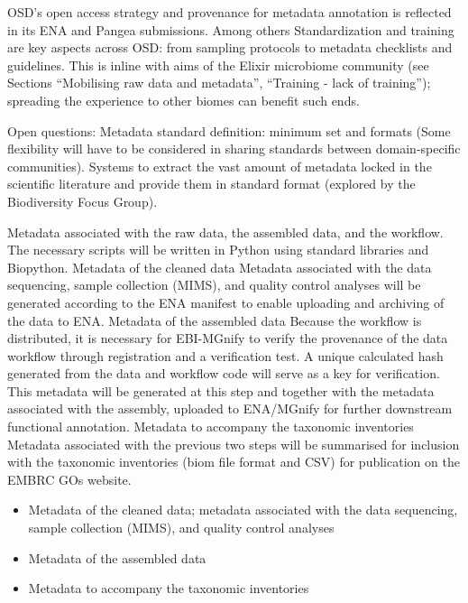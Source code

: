 OSD’s open access strategy and provenance for metadata annotation is reflected in its ENA and Pangea submissions. 
Among others Standardization and training are key aspects across OSD: from sampling protocols to metadata checklists and guidelines. 
This is inline with aims of the Elixir microbiome community (see Sections “Mobilising raw data and metadata”, “Training - lack of training”); 
spreading the experience to other biomes can benefit such ends.


Open questions: 
Metadata standard definition: minimum set and formats (Some flexibility will have to be considered in sharing standards between domain-specific communities).
Systems to extract the vast amount of metadata locked in the scientific literature and provide them in standard format (explored by the Biodiversity Focus Group).


Metadata associated with the raw data, the assembled data, and the workflow. The necessary scripts will be written in Python using standard libraries and Biopython. 
Metadata of the cleaned data
Metadata associated with the data sequencing, sample collection (MIMS), and quality control analyses will be generated according to the ENA manifest to enable uploading and archiving of the data to ENA.
Metadata of the assembled data
Because the workflow is distributed, it is necessary for EBI-MGnify to verify the provenance of the data workflow through registration and a verification test. A unique calculated hash generated from the data and workflow code will serve as a key for verification. This metadata will be generated at this step and together with the metadata associated with the assembly, uploaded to ENA/MGnify for further downstream functional annotation.
Metadata to accompany the taxonomic inventories
Metadata associated with the previous two steps will be summarised for inclusion with the taxonomic inventories (biom file format and CSV) for publication on the EMBRC GOs website.


\begin{itemize}
   \item Metadata of the cleaned data; metadata associated with the data sequencing, sample collection (MIMS), and quality control analyses
   \item Metadata of the assembled data
   \item Metadata to accompany the taxonomic inventories

\end{itemize}  




